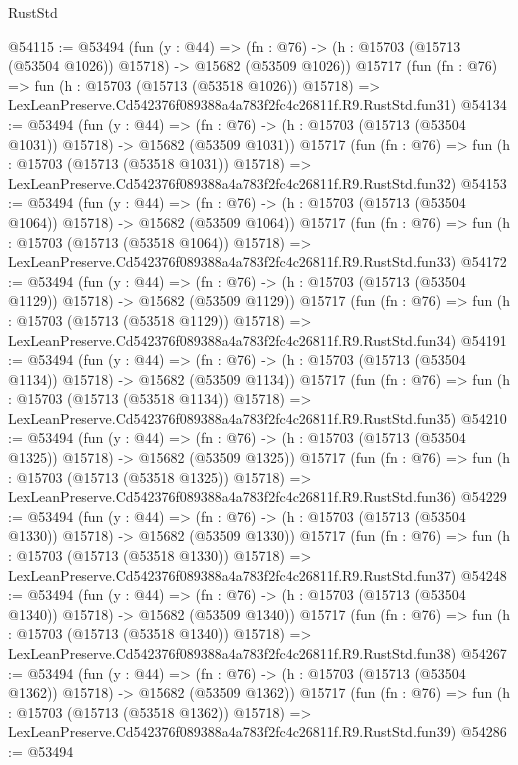 \begin{lexlean}{RustStd}
\begin{coremodule}
@54115 := @53494
    (fun (y : @44) =>
    (fn : @76) -> (h : @15703 (@15713 (@53504 @1026)) @15718) -> @15682 (@53509 @1026))
    @15717
    (fun (fn : @76) =>
    fun (h : @15703 (@15713 (@53518 @1026)) @15718) =>
    LexLeanPreserve.Cd542376f089388a4a783f2fc4c26811f.R9.RustStd.fun31)
@54134 := @53494
    (fun (y : @44) =>
    (fn : @76) -> (h : @15703 (@15713 (@53504 @1031)) @15718) -> @15682 (@53509 @1031))
    @15717
    (fun (fn : @76) =>
    fun (h : @15703 (@15713 (@53518 @1031)) @15718) =>
    LexLeanPreserve.Cd542376f089388a4a783f2fc4c26811f.R9.RustStd.fun32)
@54153 := @53494
    (fun (y : @44) =>
    (fn : @76) -> (h : @15703 (@15713 (@53504 @1064)) @15718) -> @15682 (@53509 @1064))
    @15717
    (fun (fn : @76) =>
    fun (h : @15703 (@15713 (@53518 @1064)) @15718) =>
    LexLeanPreserve.Cd542376f089388a4a783f2fc4c26811f.R9.RustStd.fun33)
@54172 := @53494
    (fun (y : @44) =>
    (fn : @76) -> (h : @15703 (@15713 (@53504 @1129)) @15718) -> @15682 (@53509 @1129))
    @15717
    (fun (fn : @76) =>
    fun (h : @15703 (@15713 (@53518 @1129)) @15718) =>
    LexLeanPreserve.Cd542376f089388a4a783f2fc4c26811f.R9.RustStd.fun34)
@54191 := @53494
    (fun (y : @44) =>
    (fn : @76) -> (h : @15703 (@15713 (@53504 @1134)) @15718) -> @15682 (@53509 @1134))
    @15717
    (fun (fn : @76) =>
    fun (h : @15703 (@15713 (@53518 @1134)) @15718) =>
    LexLeanPreserve.Cd542376f089388a4a783f2fc4c26811f.R9.RustStd.fun35)
@54210 := @53494
    (fun (y : @44) =>
    (fn : @76) -> (h : @15703 (@15713 (@53504 @1325)) @15718) -> @15682 (@53509 @1325))
    @15717
    (fun (fn : @76) =>
    fun (h : @15703 (@15713 (@53518 @1325)) @15718) =>
    LexLeanPreserve.Cd542376f089388a4a783f2fc4c26811f.R9.RustStd.fun36)
@54229 := @53494
    (fun (y : @44) =>
    (fn : @76) -> (h : @15703 (@15713 (@53504 @1330)) @15718) -> @15682 (@53509 @1330))
    @15717
    (fun (fn : @76) =>
    fun (h : @15703 (@15713 (@53518 @1330)) @15718) =>
    LexLeanPreserve.Cd542376f089388a4a783f2fc4c26811f.R9.RustStd.fun37)
@54248 := @53494
    (fun (y : @44) =>
    (fn : @76) -> (h : @15703 (@15713 (@53504 @1340)) @15718) -> @15682 (@53509 @1340))
    @15717
    (fun (fn : @76) =>
    fun (h : @15703 (@15713 (@53518 @1340)) @15718) =>
    LexLeanPreserve.Cd542376f089388a4a783f2fc4c26811f.R9.RustStd.fun38)
@54267 := @53494
    (fun (y : @44) =>
    (fn : @76) -> (h : @15703 (@15713 (@53504 @1362)) @15718) -> @15682 (@53509 @1362))
    @15717
    (fun (fn : @76) =>
    fun (h : @15703 (@15713 (@53518 @1362)) @15718) =>
    LexLeanPreserve.Cd542376f089388a4a783f2fc4c26811f.R9.RustStd.fun39)
@54286 := @53494

\end{coremodule}
\end{lexlean}
